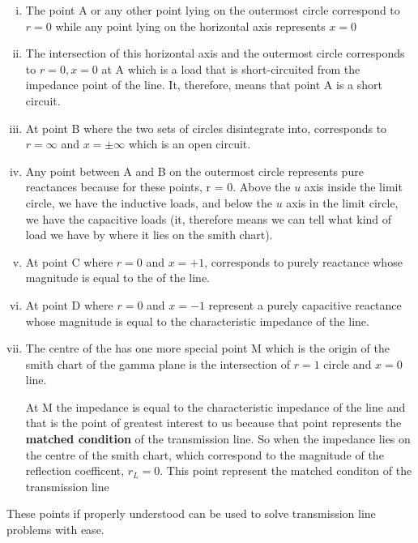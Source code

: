\begin{enumerate}[(i)]
\item The point A or any other point lying on the outermost circle correspond to $r = 0$ while any point lying on the horizontal axis represents $x = 0$

\item The intersection of this horizontal axis and the outermost circle corresponds to $r = 0,x = 0$ at A which is a load that is short-circuited from the impedance point of the line. It, therefore, means that point A is a short circuit.

\item At point B where the two sets of circles disintegrate into, corresponds to $r = \infty$ and $x = \pm\infty $ which is an open circuit.

\item Any point between A and B on the outermost circle represents pure reactances because for these points, r = 0. Above the $u$ axis inside the limit circle, we have the inductive loads, and below the $u$ axis in the limit circle, we have the capacitive loads (it, therefore means we can tell what kind of load we have by where it lies on the smith chart).

\item At point C where $r = 0$ and $x = +1$, corresponds to purely reactance whose magnitude is equal to the  of the line.

\item At point D where $r = 0$ and $x = -1$ represent a purely capacitive reactance whose magnitude is equal to the characteristic impedance of the line.

\item The centre of the  has one more special point M which is the origin of the smith chart of the gamma plane is the intersection of $r = 1$ circle and $x = 0$ line.

At M the impedance is equal to the characteristic impedance of the line and that is the point of greatest interest to us because that point represents the \textbf{matched condition} of the transmission line. So when the impedance lies on the centre of the smith chart, which correspond to the magnitude of the reflection coefficent, $r_L = 0$. This point represent the matched conditon of the transmission line
\end{enumerate}
These points if properly understood can be used to solve transmission line problems with ease.

